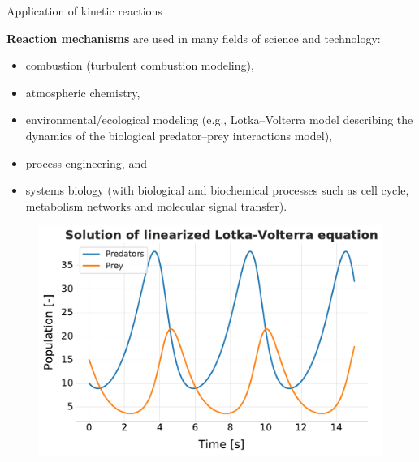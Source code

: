 \begin{frame}{Application of kinetic reactions}
	
 \alert{\bf Reaction mechanisms} are used in many fields of science and technology: 

\lcol
{
\begin{itemize}
	\item combustion (turbulent combustion modeling),
	\item atmospheric chemistry,
	\item environmental/ecological modeling (e.g., Lotka--Volterra model describing the dynamics of the biological predator–prey interactions model), 
	\item process engineering, and 
	\item systems biology (with biological and biochemical processes such as cell cycle, metabolism networks and molecular signal transfer).
\end{itemize}
}

\rcol

\begin{figure}
	\vskip 10pt
	\centering
	\includegraphics[height=0.6\columnwidth]{figures/chemical-kinetics/lotka-volterra}
\end{figure}

\ecol
\end{frame}
%
%
